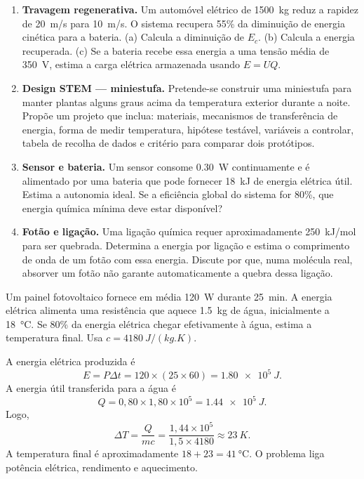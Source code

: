 \documentclass[11pt,a4paper,oneside]{book}
\begin{document}
\begin{exercicios}[title=Desafios integradores]
\begin{enumerate}
  \item \textbf{Travagem regenerativa.} Um automóvel elétrico de \SI{1500}{kg} reduz a rapidez de \SI{20}{m/s} para \SI{10}{m/s}. O sistema recupera 55\% da diminuição de energia cinética para a bateria. (a) Calcula a diminuição de $E_c$. (b) Calcula a energia recuperada. (c) Se a bateria recebe essa energia a uma tensão média de \SI{350}{V}, estima a carga elétrica armazenada usando $E=UQ$.

  \item \textbf{Design STEM — miniestufa.} Pretende-se construir uma miniestufa para manter plantas alguns graus acima da temperatura exterior durante a noite. Propõe um projeto que inclua: materiais, mecanismos de transferência de energia, forma de medir temperatura, hipótese testável, variáveis a controlar, tabela de recolha de dados e critério para comparar dois protótipos.
  \item \textbf{Sensor e bateria.} Um sensor consome \SI{0.30}{W} continuamente e é alimentado por uma bateria que pode fornecer \SI{18}{kJ} de energia elétrica útil. Estima a autonomia ideal. Se a eficiência global do sistema for 80\%, que energia química mínima deve estar disponível?
  \item \textbf{Fotão e ligação.} Uma ligação química requer aproximadamente \SI{250}{kJ/mol} para ser quebrada. Determina a energia por ligação e estima o comprimento de onda de um fotão com essa energia. Discute por que, numa molécula real, absorver um fotão não garante automaticamente a quebra dessa ligação.
\end{enumerate}
\end{exercicios}

\begin{exemplo}[title=Exemplo resolvido -- painel solar a aquecer água]
Um painel fotovoltaico fornece em média \SI{120}{W} durante \SI{25}{min}. A energia elétrica alimenta uma resistência que aquece \SI{1.5}{kg} de água, inicialmente a \SI{18}{\celsius}. Se 80\% da energia elétrica chegar efetivamente à água, estima a temperatura final. Usa $c=\SI{4180}{J/(kg.K)}$.

A energia elétrica produzida é
\[
E=P\Delta t=120\times(25\times60)=\SI{1.80e5}{J}.
\]
A energia útil transferida para a água é
\[
Q=0{,}80\times1{,}80\times10^5=\SI{1.44e5}{J}.
\]
Logo,
\[
\Delta T=\frac{Q}{mc}=\frac{1{,}44\times10^5}{1{,}5\times4180}\approx\SI{23}{K}.
\]
A temperatura final é aproximadamente $18+23=\SI{41}{\celsius}$. O problema liga potência elétrica, rendimento e aquecimento.
\end{exemplo}
\end{document}
